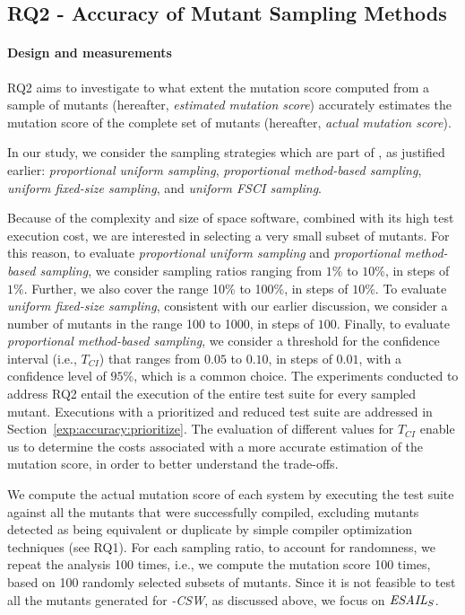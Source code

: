 \subsection{RQ2 - Accuracy of Mutant Sampling Methods}
\label{sec:RQ2}
\paragraph{Design and measurements}


RQ2 aims to investigate  
to what extent the mutation score computed from a sample of mutants (hereafter, \emph{estimated mutation score}) accurately estimates the mutation score of the complete set of mutants (hereafter, \emph{actual mutation score}).

In our study, we consider the sampling strategies which are part of \APPR, as justified earlier: \emph{proportional uniform sampling}, \emph{proportional method-based sampling},  \emph{uniform fixed-size sampling}, and \emph{uniform FSCI sampling}. 


Because of the complexity and size of space software, combined with its high test execution cost, we are interested in selecting a very small subset of mutants. 
For this reason, 
to evaluate  \emph{proportional uniform sampling} and \emph{proportional method-based sampling},
we consider sampling ratios ranging from $1\%$ to $10\%$, in steps of $1\%$. Further,
 we also cover the range 10\% to 100\%, in steps of $10\%$. To evaluate  \emph{uniform fixed-size sampling}, consistent with our earlier discussion, we consider a number of mutants in the range 100 to 1000, in steps of $100$.
Finally, to evaluate \emph{proportional method-based sampling}, we consider a threshold for the confidence interval (i.e., $T_{\mathit{CI}}$) that ranges from $0.05$ to $0.10$, in steps of $0.01$, with a confidence level of $95\%$, which is a common choice. The experiments conducted to address RQ2 entail the execution of the entire test suite for every sampled mutant. Executions with a prioritized and reduced test suite are addressed in Section~\ref{exp:accuracy:prioritize}. The evaluation of different values for $T_{\mathit{CI}}$ enable us to determine the costs associated with a more accurate estimation of the mutation score, in order to better understand the trade-offs.


We compute the actual mutation score of each system by executing the test suite against all the mutants that were successfully compiled, excluding mutants detected as being equivalent or duplicate by simple compiler optimization techniques (see RQ1). 
For each sampling ratio, to account for randomness,
we repeat the analysis 100 times, i.e., we compute the mutation score 100 times, based on 100 randomly selected subsets of mutants.
Since it is not feasible to test all the mutants generated for \SAIL{}\emph{-CSW}, as discussed above, we focus on $\mathit{\emph{ESAIL}{}}_{S}$.



